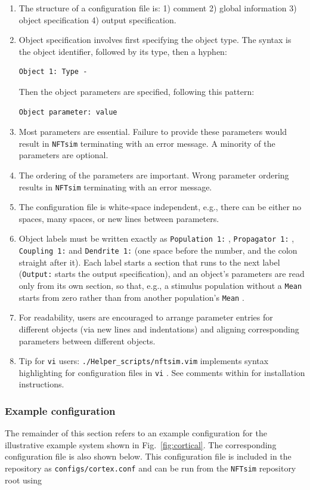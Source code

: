 \documentclass[12pt,a4paper]{article}
\newcommand{\type}[1]{{\small\small\tt #1} }
\newcommand{\NF}[0]{\type{NFTsim}}
\begin{document}
\begin{enumerate}
    \item The structure of a configuration file is: 1) comment 2) global information 3) object specification 4) output specification.
    \item Object specification involves first specifying the object type. The syntax is the object identifier, followed by its type, then a hyphen:
        \begin{lstlisting}
Object 1: Type -
        \end{lstlisting}
        Then the object parameters are specified, following this pattern:
        \begin{lstlisting}
Object parameter: value
        \end{lstlisting}
    \item Most parameters are essential. Failure to provide these parameters would result in \NF terminating with an error message. A minority of the parameters are optional.
    \item The ordering of the parameters are important. Wrong parameter ordering results in \NF terminating with an error message.
    \item The configuration file is white-space independent, e.g., there can be either no spaces, many spaces, or new lines between parameters.
    \item Object labels must be written exactly as \type{Population 1:}, \type{Propagator 1:}, \type{Coupling 1:} and \type{Dendrite 1:} (one space before the number, and the colon straight after it).
    Each label starts a section that runs to the next label (\type{Output:} starts the output specification), and an object's parameters are read only from its own section, so that, e.g., a stimulus population without a \type{Mean} starts from zero rather than from another population's \type{Mean}.
    \item For readability, users are encouraged to arrange parameter entries for different objects (via new lines and indentations) and aligning corresponding parameters between different objects.
    \item Tip for \type{vi} users: \type{./Helper\_scripts/nftsim.vim} implements syntax highlighting for configuration files in \type{vi}. See comments within for installation instructions.
\end{enumerate}

\subsubsection{Example configuration}
The remainder of this section refers to an example configuration for the illustrative example system shown in Fig.~\ref{fig:cortical}. The corresponding configuration file is also shown below. This configuration file is included in the repository as \type{configs/cortex.conf} and can be run from the \NF repository root using
\end{document}
